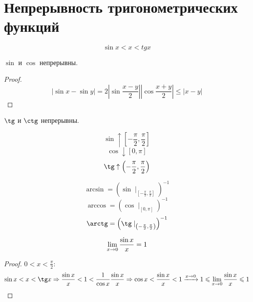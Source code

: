 \section{Непрерывность тригонометрических функций}
\begin{theorem}{}
$$\sin x < x < tg x$$
\end{theorem}
                        
\begin{conseq}
$\sin$ и $\cos$ непрерывны. 
\end{conseq}
\begin{proof}
$$\left|\sin x - \sin y\right| = 2 \left|\sin \frac{x-y}2\right| \left|\cos \frac{x+y}2\right| \leqslant \left|x - y\right|$$
\end{proof}

\begin{conseq}
$\tg$ и $\ctg$ непрерывны. 
\end{conseq}

\begin{conseq}
$$\sin \uparrow   \left[-\frac\pi2,\frac\pi2\right]$$
$$\cos \downarrow \left[0,\pi\right]$$
$$\tg  \uparrow   \left(-\frac\pi2,\frac\pi2\right)$$
\end{conseq}

\begin{Def}
$$ \arcsin = \left(\sin \mid_{\left[-\frac\pi2,\frac\pi2\right]}\right)^{-1} $$
$$ \arccos = \left(\cos \mid_{\left[0,\pi\right]}\right)^{-1} $$
$$ \arctg  = \left(\tg  \mid_{\left(-\frac\pi2,\frac\pi2\right)}\right)^{-1} $$
\end{Def}

\begin{theorem}{}
$$\lim_{x \rightarrow 0} \frac{\sin x}x = 1$$
\end{theorem}
\begin{proof}
$0 < x < \frac\pi2$:
$$\sin x < x < \tg x \Ra \frac{\sin x}x < 1 < \frac1{\cos x} \frac{\sin x}x \Ra \cos x < \frac{\sin x}x < 1 \xra{x\ra0} 1 \leqslant \lim_{x\ra0} \frac{\sin x}x \leqslant 1$$
\end{proof}